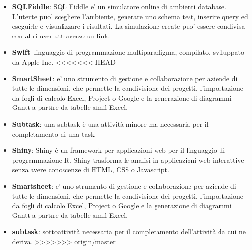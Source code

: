 \begin{itemize}
	\item \textbf{SQLFiddle}: SQL Fiddle e' un simulatore online di ambienti database. L'utente puo' scegliere l'ambiente, generare uno schema test, inserire query ed eseguirle e visualizzare i risultati. La simulazione create puo' essere condivisa con altri user attraverso un link.
	\item \textbf{Swift}: linguaggio di programmazione multiparadigma, compilato, sviluppato da Apple Inc.
<<<<<<< HEAD
	\item \textbf{SmartSheet}: e' uno strumento di gestione e collaborazione per aziende di tutte le dimensioni, che permette la condivisione dei progetti, l'importazione da fogli di calcolo Excel, Project o Google e la generazione di diagrammi Gantt a partire da tabelle simil-Excel.
	\item \textbf{Subtask}: una subtask è una attività minore ma necessaria per il completamento di una task.  
	\item \textbf{Shiny}: Shiny è un framework per applicazioni web per il linguaggio di programmazione R. Shiny trasforma le analisi in applicazioni web interattive senza avere conoscenze di HTML, CSS o Javascript.
=======
	\item \textbf{Smartsheet}: e' uno strumento di gestione e collaborazione per aziende di tutte le dimensioni, che permette la condivisione dei progetti, l'importazione da fogli di calcolo Excel, Project o Google e la generazione di diagrammi Gantt a partire da tabelle simil-Excel.
	\item \textbf{subtask}: sottoattività necessaria per il completamento dell'attività da cui ne deriva.  
>>>>>>> origin/master
\end{itemize}